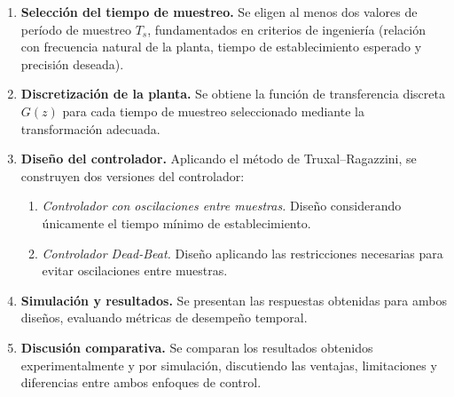 \begin{enumerate}
	
	\item \textbf{Selección del tiempo de muestreo.}  
	Se eligen al menos dos valores de período de muestreo $T_s$, fundamentados en criterios de ingeniería (relación con frecuencia natural de la planta, tiempo de establecimiento esperado y precisión deseada).
	
	\item \textbf{Discretización de la planta.}  
	Se obtiene la función de transferencia discreta $G(z)$ para cada tiempo de muestreo seleccionado mediante la transformación adecuada.
	
	\item \textbf{Diseño del controlador.}  
	Aplicando el método de Truxal--Ragazzini, se construyen dos versiones del controlador:
	\begin{enumerate}
		\item \emph{Controlador con oscilaciones entre muestras.}  
		Diseño considerando únicamente el tiempo mínimo de establecimiento.
		
		\item \emph{Controlador Dead-Beat.}  
		Diseño aplicando las restricciones necesarias para evitar oscilaciones entre muestras.
	\end{enumerate}
	
	\item \textbf{Simulación y resultados.}  
	Se presentan las respuestas obtenidas para ambos diseños, evaluando métricas de desempeño temporal.
	
	\item \textbf{Discusión comparativa.}  
	Se comparan los resultados obtenidos experimentalmente y por simulación, discutiendo las ventajas, limitaciones y diferencias entre ambos enfoques de control.
\end{enumerate}
